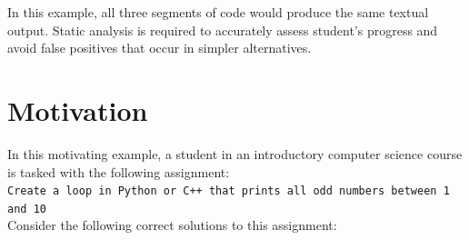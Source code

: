 \documentclass[thesis]{hmcposter}
\begin{document}
\begin{poster}
\begin{figure}
\begin{center}
\hspace{0.3in}
\end{center}
\end{figure}

In this example, all three segments of code would produce the same textual output. Static analysis is required to accurately assess student's progress and avoid false positives that occur in simpler alternatives.

\section{Motivation}
In this motivating example, a student in an introductory computer science course is tasked with the following assignment:
\\
\texttt{Create a loop in Python or C++ that prints all odd numbers between 1 and 10}
\\
Consider the following correct solutions to this assignment:


\end{poster}
\end{document}
